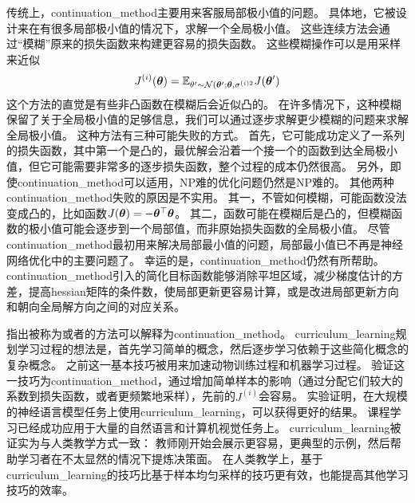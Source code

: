 传统上，\gls{continuation_method}主要用来客服局部极小值的问题。
具体地，它被设计来在有很多局部极小值的情况下，求解一个全局极小值。
这些连续方法会通过“模糊”原来的损失函数来构建更容易的损失函数。
这些模糊操作可以是用采样来近似
\begin{equation}
    J^{(i)}(\boldsymbol{\theta}) = \mathbb{E}_{\theta' \sim \mathcal{N}(\boldsymbol{\theta}'; \boldsymbol{\theta}, \sigma^{(i)2}} J(\boldsymbol{\theta}')
\end{equation}
这个方法的直觉是有些非凸函数在模糊后会近似凸的。
在许多情况下，这种模糊保留了关于全局极小值的足够信息，我们可以通过逐步求解更少模糊的问题来求解全局极小值。
这种方法有三种可能失败的方式。
首先，它可能成功定义了一系列的损失函数，其中第一个是凸的，最优解会沿着一个接一个的函数到达全局极小值，但它可能需要非常多的逐步损失函数，整个过程的成本仍然很高。
另外，即使\gls{continuation_method}可以适用，NP难的优化问题仍然是NP难的。
其他两种\gls{continuation_method}失败的原因是不实用。
其一，不管如何模糊，可能函数没法变成凸的，比如函数$J(\boldsymbol{\theta}) = -\boldsymbol{\theta}^\top \boldsymbol{\theta}$。
其二，函数可能在模糊后是凸的，但模糊函数的极小值可能会逐步到一个局部值，而非原始损失函数的全局极小值。
尽管\gls{continuation_method}最初用来解决局部最小值的问题，局部最小值已不再是神经网络优化中的主要问题了。
幸运的是，\gls{continuation_method}仍然有所帮助。
\gls{continuation_method}引入的简化目标函数能够消除平坦区域，减少梯度估计的方差，提高\gls{hessian}矩阵的条件数，使局部更新更容易计算，或是改进局部更新方向和朝向全局解方向之间的对应关系。

\cite{Bengio+al-2009}指出被称为或者的方法可以解释为\gls{continuation_method}。
\gls{curriculum_learning}规划学习过程的想法是，首先学习简单的概念，然后逐步学习依赖于这些简化概念的复杂概念。
之前这一基本技巧被用来加速动物训练过程\citep{Skinner1958,Peterson2004,Krueger+Dayan-2009}和机器学习过程\citep{solomonoff1989system,Elman93,Sanger-1994}。
\cite{Bengio+al-2009}验证这一技巧为\gls{continuation_method}，通过增加简单样本的影响（通过分配它们较大的系数到损失函数，或者更频繁地采样），先前的$J^{(i)}$会容易。
实验证明，在大规模的神经语言模型任务上使用\gls{curriculum_learning}，可以获得更好的结果。
课程学习已经成功应用于大量的自然语言\citep{Spitkovsky-et-al-HLT2010,collobert2011natural,Mikolov-ASRU-2011,Tu+Honavar-IJCAI2011}和计算机视觉\citep{Kumar+al-2010,Lee+Grauman-CVPR2011,Supancic+Ramanan-CVPR2013}任务上。
\gls{curriculum_learning}被证实为与人类教学方式一致\citep{Khan+Zhu+Mutlu-2011}：
教师刚开始会展示更容易，更典型的示例，然后帮助学习者在不太显然的情况下提炼决策面。
在人类教学上，基于\gls{curriculum_learning}的技巧比基于样本均匀采样的技巧更有效，也能提高其他学习技巧的效率\citep{Basu+Christensen-AAAI2013}。

